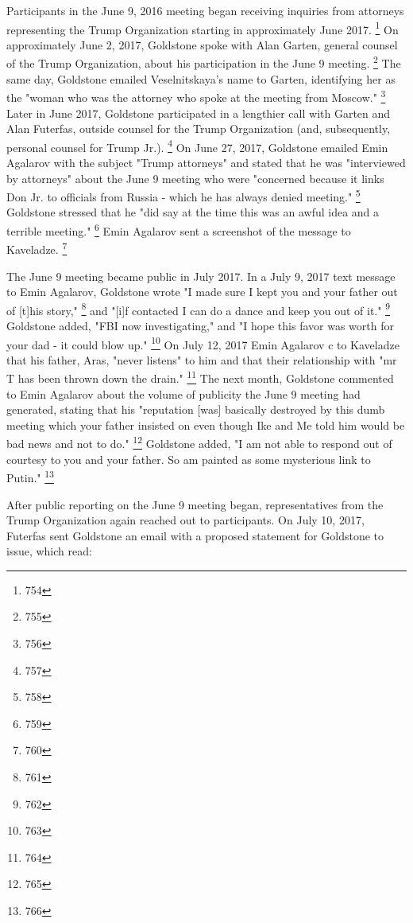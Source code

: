 Participants in the June 9, 2016 meeting began receiving inquiries from attorneys representing the Trump Organization starting in approximately June 2017.%
\footnote{754}
On approximately June 2, 2017, Goldstone spoke with Alan Garten, general counsel of the Trump Organization, about his participation in the June 9 meeting.%
\footnote{755}
The same day, Goldstone emailed Veselnitskaya's name to Garten, identifying her as the "woman who was the attorney who spoke at the meeting from Moscow."%
\footnote{756}
Later in June 2017, Goldstone participated in a lengthier call with Garten and Alan Futerfas, outside counsel for the Trump Organization (and, subsequently, personal counsel for Trump Jr.).%
\footnote{757}
On June 27, 2017, Goldstone emailed Emin Agalarov with the subject "Trump attorneys" and stated that he was "interviewed by attorneys" about the June 9 meeting who were "concerned because it links Don Jr. to officials from Russia - which he has always denied meeting."%
\footnote{758}
Goldstone stressed that he "did say at the time this was an awful idea and a terrible meeting."%
\footnote{759}
Emin Agalarov sent a screenshot of the message to Kaveladze.%
\footnote{760}

The June 9 meeting became public in July 2017.
In a July 9, 2017 text message to Emin Agalarov, Goldstone wrote "I made sure I kept you and your father out of [t]his story,"%
\footnote{761}
and "[i]f contacted I can do a dance and keep you out of it."%
\footnote{762}
Goldstone added, "FBI now investigating," and "I hope this favor was worth for your dad - it could blow up."%
\footnote{763}
On July 12, 2017 Emin Agalarov c to Kaveladze that his father, Aras, "never listens" to him and that their relationship with "mr T has been thrown down the drain."%
\footnote{764}
The next month, Goldstone commented to Emin Agalarov about the volume of publicity the June 9 meeting had generated, stating that his "reputation [was] basically destroyed by this dumb meeting which your father insisted on even though Ike and Me told him would be bad news and not to do."%
\footnote{765}
Goldstone added, "I am not able to respond out of courtesy to you and your father.
So am painted as some mysterious link to Putin."%
\footnote{766}

After public reporting on the June 9 meeting began, representatives from the Trump Organization again reached out to participants.
On July 10, 2017, Futerfas sent Goldstone an email with a proposed statement for Goldstone to issue, which read:

